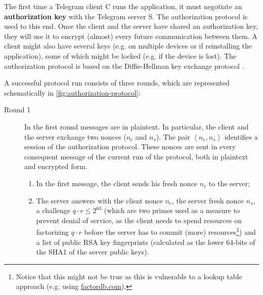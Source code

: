 The first time a Telegram client C runs the application, it must negotiate an \textbf{authorization key} with the Telegram server S. The authorization protocol is used to this end. Once the client and the server have shared an authorization key, they will use it to encrypt (almost) every future communication between them. A client might also have several keys (e.g. on multiple devices or if reinstalling the application), some of which might be locked (e.g. if the device is lost). The authorization protocol is based on the Diffie-Hellman key exchange protocol \cite{DH-protocol}.


A successful protocol run consists of three rounds, which are represented schematically in \cref{fig:authorization-protocol}:
\begin{description}
    \item[Round 1] In the first round messages are in plaintext. In particular, the client and the server exchange two nonces ($n_c$ and $n_s$). The pair $\left<n_c, n_s\right>$ identifies a session of the authorization protocol. These nonces are sent in every consequent message of the current run of the protocol, both in plaintext and encrypted form.
    \begin{enumerate}
        \item{In the first message, the client sends his fresh nonce $n_c$ to the server;}
        \item{The server answers with the client nonce $n_c$, the server fresh nonce $n_s$, a challenge $q \cdot r \leq 2^{63}$ (which are two primes used as a measure to prevent denial of service, as the client needs to spend resources on factorizing $q \cdot r$ before the server has to commit (more) resources\footnote{Notice that this might not be true as this is vulnerable to a lookup table approach (e.g. using \href{http://factordb.com}{factordb.com}).}) and a list of public RSA key fingerprints (calculated as the lower 64-bits of the SHA1 of the server public keys).}
    \end{enumerate}


\end{description}
